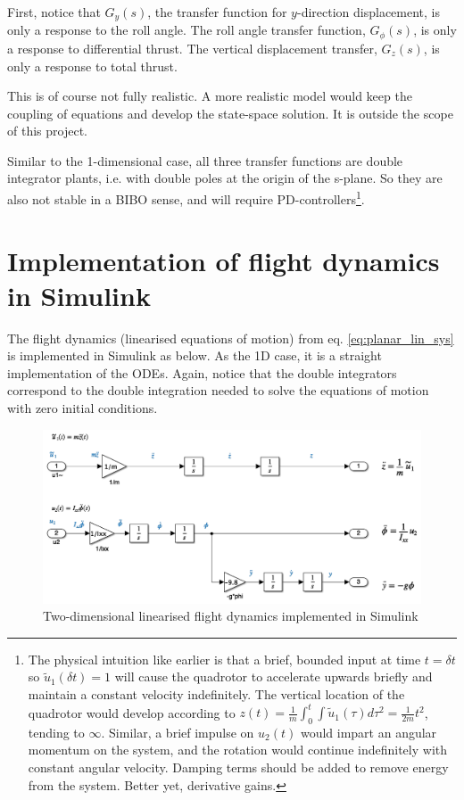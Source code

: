 \documentclass[a4paper]{report}
\begin{document}
First, notice that $G_y(s)$, the transfer function for $y$-direction displacement, is only a response to the roll angle. 
The roll angle transfer function, $G_{\phi}(s)$, is only a response to differential thrust.
The vertical displacement transfer, $G_z(s)$, is only a response to total thrust.

This is of course not fully realistic. 
A more realistic model would keep the coupling of equations and develop the state-space solution. It is outside the scope of this project.

Similar to the 1-dimensional case, all three transfer functions are double integrator plants, i.e. with double poles at the origin of the s-plane. 
So they are also not stable in a BIBO sense, and will require PD-controllers\footnote{
The physical intuition like earlier is that a brief, bounded input at time $t=\delta t$ so $\tilde{u}_1(\delta t)=1$ will cause the quadrotor to accelerate upwards briefly and maintain a constant velocity indefinitely.
The vertical location of the quadrotor would develop according to $z(t)=\frac{1}{m} \int_0^t \int \tilde{u}_1(\tau) d\tau^2 = \frac{1}{2m} t^2 $, tending to $\infty$.
Similar, a brief impulse on $u_2(t)$ would impart an angular momentum on the system, and the rotation would continue indefinitely with constant angular velocity.
Damping terms should be added to remove energy from the system. Better yet, derivative gains.
}.

\section{Implementation of flight dynamics in Simulink}

The flight dynamics (linearised equations of motion) from eq. \ref{eq:planar_lin_sys} is implemented in Simulink as below. 
As the 1D case, it is a straight implementation of the \gls{ODE}s.
Again, notice that the double integrators correspond to the double integration needed to solve the equations of motion with zero initial conditions.

\begin{figure}[H]
\centering
\includegraphics[width=15cm]{img/flight_dyn_2d.png}
\caption{Two-dimensional linearised flight dynamics implemented in Simulink\label{fig:flight_dyn_2d}}
\end{figure}
\end{document}
